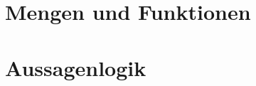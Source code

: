 \documentclass[handout,aspectratio=1610,dvipsnames]{beamer}
\begin{document}
  \section[Mengen und Funktionen]{Mengen und Funktionen}
  \let\woopsi\section\let\section\subsection\let\subsection\subsubsection
  
  \let\subsection\section\let\section\woopsi

  \section[Aussagenlogik]{Aussagenlogik}
  \let\woopsi\section\let\section\subsection\let\subsection\subsubsection
  
  \let\subsection\section\let\section\woopsi
\end{document}
